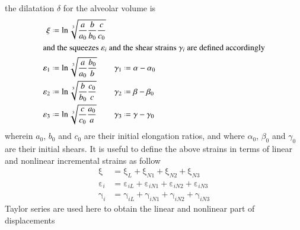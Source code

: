 the dilatation $\delta$ for the alveolar volume is 
\begin{subequations}
	\begin{align}
	 \mathrm  \xi & \defeq \ln \sqrt[3]{\frac{a}{a_0}
		\frac{b}{b_0} \frac{c}{c_0}} \\
	\intertext{and the squeezes $\varepsilon_i$ and the shear strains $\gamma_i$ are defined accordingly}
	\varepsilon_1 & \defeq \ln \sqrt[3]{\frac{a}
		{a_0} \frac{b_0}{b}} & 	\gamma_1 & \defeq \alpha - \alpha_0 \\
	\varepsilon_2 & \defeq \ln \sqrt[3]{\frac{b}
		{b_0} \frac{c_0}{c}} & \gamma_2 & \defeq \beta - \beta_0 \\
	\varepsilon_3 & \defeq \ln \sqrt[3]{\frac{c}
		{c_0} \frac{a_0}{a}} & 	\gamma_3 & \defeq \gamma - \gamma_0 
	\end{align}
\end{subequations}
wherein $a_0$, $b_0$ and $c_0$ are their initial elongation ratios, and where $\alpha_0$, $\beta_0$ and $\gamma_0$ are their initial shears.
It is useful to define the above strains in terms of linear and nonlinear incremental strains as follow
\begin{subequations}
	\begin{align}
	\mathrm  \xi & = \mathrm \xi_{L} + \mathrm  \xi_{N1} + \mathrm  \xi_{N2} + \mathrm  \xi_{N3}\\
	\mathrm  \varepsilon_{i} & = \mathrm  \varepsilon_{iL} + \mathrm  \varepsilon_{iN1} + \mathrm  \varepsilon_{iN2} + \mathrm  \varepsilon_{iN3} \\
	\mathrm \gamma_{i} & = \mathrm  \gamma_{iL} + \mathrm  \gamma_{iN1} + \mathrm  \gamma_{iN2} + \mathrm  \gamma_{iN3}
	\end{align}
	\label{totalvirtualstrain}
\end{subequations}
Taylor series are used here to obtain the linear and nonlinear part of displacements 
